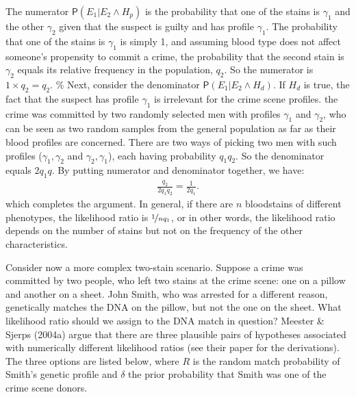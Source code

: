 \documentclass[
  10pt,
  dvipsnames,enabledeprecatedfontcommands]{scrartcl}
\newcommand{\pr}[1]{\mathsf{P}(#1)}
\begin{document}
\noindent The numerator \(\pr{E_1 \vert E_2 \wedge H_p}\) is the
probability that one of the stains is \(\gamma_1\) and the other
\(\gamma_2\) given that the suspect is guilty and has profile
\(\gamma_1\). The probability that one of the stains is \(\gamma_1\) is
simply 1, and assuming blood type does not affect someone's propensity
to commit a crime, the probability that the second stain is \(\gamma_2\)
equals its relative frequency in the population, \(q_2\). So the
numerator is \(1\times q_2 = q_2\). \% Next, consider the denominator
\(\pr{E_1 \vert E_2 \wedge H_d}\). If \(H_d\) is true, the fact that the
suspect has profile \(\gamma_1\) is irrelevant for the crime scene
profiles. the crime was committed by two randomly selected men with
profiles \(\gamma_1\) and \(\gamma_2\), who can be seen as two random
samples from the general population as far as their blood profiles are
concerned. There are two ways of picking two men with such profiles
(\(\gamma_1,\gamma_2\) and \(\gamma_2,\gamma_1\)), each having
probability \(q_1q_2\). So the denominator equals \(2q_1q\). By putting
numerator and denominator together, we have: \begin{align*}
 \frac{q_2}{2q_1q_2} = \frac{1}{2q_1}. 
 \end{align*} \noindent which completes the argument. In general, if
there are \(n\) bloodstains of different phenotypes, the likelihood
ratio is \(\nicefrac{1}{nq_1}\), or in other words, the likelihood ratio
depends on the number of stains but not on the frequency of the other
characteristics.

Consider now a more complex two-stain scenario. Suppose a crime was
committed by two people, who left two stains at the crime scene: one on
a pillow and another on a sheet. John Smith, who was arrested for a
different reason, genetically matches the DNA on the pillow, but not the
one on the sheet. What likelihood ratio should we assign to the DNA
match in question? Meester \& Sjerps (2004a) argue that there are three
plausible pairs of hypotheses associated with numerically different
likelihood ratios (see their paper for the derivations). The three
options are listed below, where \(R\) is the random match probability of
Smith's genetic profile and \(\delta\) the prior probability that Smith
was one of the crime scene donors. \vspace{2mm}
\end{document}
